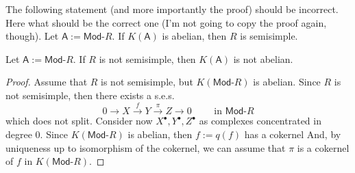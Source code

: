\begin{prop}
	The following statement (and more importantly the proof)
	should be incorrect. 
	Here what should be the correct one
	(I'm not going to copy the proof again, though).
	Let $\mathsf{A} := \mathsf{Mod}\text{-}R$.
	If $K(\mathsf{A})$ is abelian, then
	$R$ is semisimple.
\end{prop}
\begin{prop}
	Let $\mathsf{A} := \mathsf{Mod}\text{-}R$.
	If $R$ is not semisimple, then $K(\mathsf{A})$ is not abelian.
\end{prop}
\begin{proof}
	Assume that $R$ is not semisimple, but $K(\mathsf{Mod}\text{-}R)$ is abelian.
	Since $R$ is not semisimple, then there exists a s.e.s.
	\begin{equation}\label{eqn:sesAbHomCat}
	0 \to X \xrightarrow{f} Y \xrightarrow{\pi}
	Z \to 0 \qquad \text{ in } \mathsf{Mod}\text{-}R
	\end{equation} 
	which does not split.
	Consider now $X^\bullet, Y^\bullet, Z^\bullet$ as complexes concentrated in degree $0$.
	Since $K(\mathsf{Mod}\text{-}R)$ is abelian, then  $f:= q(f)$ has a cokernel
	And, by uniqueness up to isomorphism of the cokernel,
	we can assume that $\pi$ is a cokernel of $f$ in $K(\mathsf{Mod}\text{-}R)$.


\end{proof}

